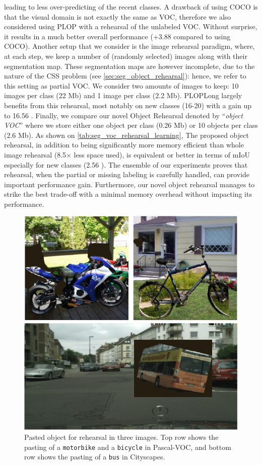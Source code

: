 leading to less over-predicting of the recent classes. A drawback of using COCO is that the visual
domain is not exactly the same as VOC, therefore we also considered using PLOP with a rehearsal of
the unlabeled VOC. Without surprise, it results in a much better overall performance (+3.88
\pp compared to using COCO). Another setup that we consider is the image rehearsal
paradigm, where, at each step, we keep a number of (randomly selected) images along with their
segmentation map. These segmentation maps are however incomplete, due to the nature of the \ac{CSS}
problem (see \autoref{sec:seg_object_rehearsal}): hence, we refer to this setting as partial VOC. We
consider two amounts of images to keep: 10 images per class (22 Mb) and 1 image per class (2.2 Mb).
PLOPLong largely benefits from this rehearsal, most notably on new classes (16-20) with a gain up to
16.56 \pp. Finally, we compare our novel Object Rehearsal denoted by ``\textit{object
    VOC}'' where we store either one object per class (0.26 Mb) or 10 objects per class (2.6 Mb). As
shown on \autoref{tab:seg_voc_rehearsal_learning}, The proposed object rehearsal, in addition to
being significantly more memory efficient than whole image rehearsal (8.5$\times$ less space used),
is equivalent or better in terms of \ac{mIoU} especially for new classes (2.56 \pp). The
ensemble of our experiments proves that rehearsal, when the partial or missing labeling is carefully
handled, can provide important performance gain. Furthermore, our novel object rehearsal manages to
strike the best trade-off with a minimal memory overhead without impacting its performance.

\begin{figure}
    \centering
    \includegraphics[width=\linewidth]{images/seg/object_pasting.pdf}
    \caption{Pasted object for rehearsal in three images. Top row shows the pasting of a
        \texttt{motorbike} and a \texttt{bicycle} in Pascal-VOC, and bottom row shows the pasting of
        a \texttt{bus} in Cityscapes.}
    \label{fig:seg_object_pasting}
\end{figure}

